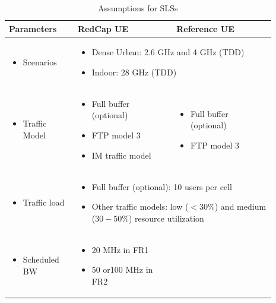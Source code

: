 \documentclass[conference]{IEEEtran}
\begin{document}
\begin{table}
\centering
\caption{Assumptions for SLSs}
\begin{tabular}{|p{0.23\linewidth}| p{0.33\linewidth} |  p{0.33\linewidth}|} 
 \hline
    \textbf{Parameters}  & \textbf{RedCap UE}  &  \textbf{Reference UE}\\
\hline

\begin{itemize}[leftmargin=0,label={}]
        \item Scenarios
    \end{itemize}  & 
    \multicolumn{2}{|p{0.66\linewidth}|}{
    \begin{itemize}[leftmargin=*]
        \item Dense Urban: 2.6 GHz and 4 GHz (TDD)
        \item Indoor: 28 GHz (TDD)
    \end{itemize} 
    }\\
\hline

    \begin{itemize}[leftmargin=0,label={}]
        \item Traffic Model
    \end{itemize}  & 
    \begin{itemize}[leftmargin=*]
        \item Full buffer (optional)
        \item FTP model 3
        \item IM traffic model
    \end{itemize}   &

    \begin{itemize}[leftmargin=*]
        \item Full buffer (optional)
        \item FTP model 3
    \end{itemize}   \\

\hline
    \begin{itemize}[leftmargin=0,label={}]
        \item Traffic load
    \end{itemize}  & 
    \multicolumn{2}{|p{0.66\linewidth}|}{
    \begin{itemize}[leftmargin=*]
        \item Full buffer (optional): 10 users per cell
        \item Other traffic models: low ($<30\%$) and medium ($30-50\%$) resource utilization
    \end{itemize} 
    }\\
\hline
    \begin{itemize}[leftmargin=0,label={}]
        \item Scheduled BW
    \end{itemize}   & 
    \begin{itemize}[leftmargin=*]
        \item 20 MHz in FR1
        \item 50 or100 MHz in FR2
    \end{itemize}   &
    

\end{tabular}
\end{table}
\end{document}
